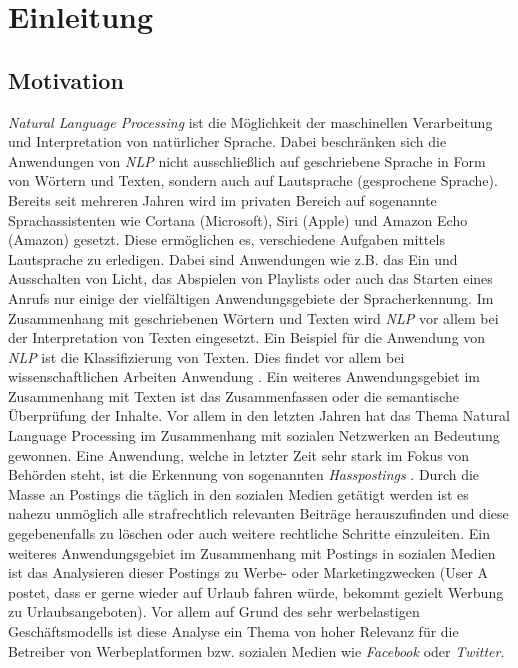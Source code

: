 \chapter{Einleitung}
\label{cha:Introduction}

\section{Motivation}
\textit{Natural Language Processing} ist die Möglichkeit der maschinellen Verarbeitung und Interpretation von natürlicher Sprache. Dabei beschränken sich die Anwendungen von \textit{NLP} nicht ausschließlich auf geschriebene Sprache in Form von Wörtern und Texten, sondern auch auf Lautsprache (gesprochene Sprache). Bereits seit mehreren Jahren wird im privaten Bereich auf sogenannte Sprachassistenten wie Cortana (Microsoft), Siri (Apple) und Amazon Echo (Amazon) gesetzt. Diese ermöglichen es, verschiedene Aufgaben mittels Lautsprache zu erledigen. Dabei sind Anwendungen wie z.B. das Ein und Ausschalten von Licht, das Abspielen von Playlists oder auch das Starten eines Anrufs nur einige der vielfältigen Anwendungsgebiete der Spracherkennung. Im Zusammenhang mit geschriebenen Wörtern und Texten wird \textit{NLP} vor allem bei der Interpretation von Texten eingesetzt. Ein Beispiel für die Anwendung von \textit{NLP} ist die Klassifizierung von Texten. Dies findet vor allem bei wissenschaftlichen Arbeiten Anwendung \cite{DannReconstructing}. Ein weiteres Anwendungsgebiet im Zusammenhang mit Texten ist das Zusammenfassen oder die semantische Überprüfung der Inhalte. Vor allem in den letzten Jahren hat das Thema Natural Language Processing im Zusammenhang mit sozialen Netzwerken an Bedeutung gewonnen. Eine Anwendung, welche in letzter Zeit sehr stark im Fokus von Behörden steht, ist die Erkennung von sogenannten \textit{Hasspostings} \cite{Nobata2016}. Durch die Masse an Postings die täglich in den sozialen Medien getätigt werden ist es nahezu unmöglich alle strafrechtlich relevanten Beiträge herauszufinden und diese gegebenenfalls zu löschen oder auch weitere rechtliche Schritte einzuleiten. Ein weiteres Anwendungsgebiet im Zusammenhang mit Postings in sozialen Medien ist das Analysieren dieser Postings zu Werbe- oder Marketingzwecken (User A postet, dass er gerne wieder auf Urlaub fahren würde, bekommt gezielt Werbung zu Urlaubsangeboten). Vor allem auf Grund des sehr werbelastigen Geschäftsmodells ist diese Analyse ein Thema von hoher Relevanz für die Betreiber von Werbeplatformen bzw. sozialen Medien wie \textit{Facebook} oder \textit{Twitter}.

